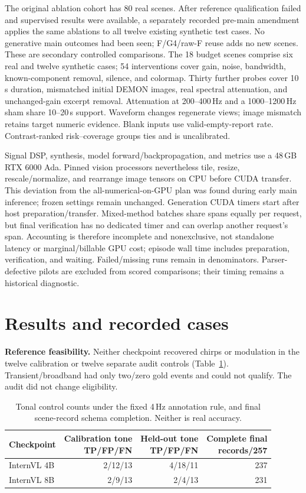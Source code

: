 \documentclass[runningheads,orivec]{llncs}
\begin{document}
The original ablation cohort has 80 real scenes. After reference qualification failed and supervised results were available, a separately recorded pre-main amendment applies the same ablations to all twelve existing synthetic test cases. No generative main outcomes had been seen; F/G4/raw-F reuse adds no new scenes. These are secondary controlled comparisons. The 18 budget scenes comprise six real and twelve synthetic cases; 54 interventions cover gain, noise, bandwidth, known-component removal, silence, and colormap. Thirty further probes cover 10\,s duration, mismatched initial DEMON images, real spectral attenuation, and unchanged-gain excerpt removal. Attenuation at 200--400\,Hz and a 1000--1200\,Hz sham share 10--20\,s support. Waveform changes regenerate views; image mismatch retains target numeric evidence. Blank inputs use valid-empty-report rate. Contrast-ranked risk--coverage groups ties and is uncalibrated.

Signal DSP, synthesis, model forward/backpropagation, and metrics use a 48\,GB RTX 6000 Ada. Pinned vision processors nevertheless tile, resize, rescale/normalize, and rearrange image tensors on CPU before CUDA transfer. This deviation from the all-numerical-on-GPU plan was found during early main inference; frozen settings remain unchanged. Generation CUDA timers start after host preparation/transfer. Mixed-method batches share spans equally per request, but final verification has no dedicated timer and can overlap another request's span. Accounting is therefore incomplete and nonexclusive, not standalone latency or marginal/billable GPU cost; episode wall time includes preparation, verification, and waiting. Failed/missing runs remain in denominators. Parser-defective pilots are excluded from scored comparisons; their timing remains a historical diagnostic.

\section{Results and recorded cases}
\textbf{Reference feasibility.} Neither checkpoint recovered chirps or modulation in the twelve calibration or twelve separate audit controls (Table~\ref{tab:annotation}). Transient/broadband had only two/zero gold events and could not qualify. The audit did not change eligibility.

\begin{table}[tb]
\caption{Tonal control counts under the fixed 4\,Hz annotation rule, and final scene-record schema completion. Neither is real accuracy.}
\label{tab:annotation}\centering\small
\begin{tabular}{@{}lrrr@{}}\toprule
Checkpoint & \shortstack{Calibration tone\\TP/FP/FN} & \shortstack{Held-out tone\\TP/FP/FN} & \shortstack{Complete final\\records/257} \\\midrule
InternVL 4B & 2/12/13 & 4/18/11 & 237 \\
InternVL 8B & 2/9/13 & 2/4/13 & 231 \\\bottomrule
\end{tabular}
\end{table}
\end{document}
